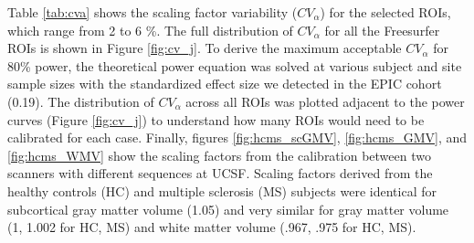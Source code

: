 Table \ref{tab:cva} shows the scaling factor variability ($CV_{\alpha}$) for the selected ROIs, which range from 2 to 6 \%. The full distribution of $CV_{\alpha}$ for all the Freesurfer ROIs is shown in Figure \ref{fig:cv_j}. To derive the maximum acceptable $CV_{\alpha}$ for 80\% power, the theoretical power equation was solved at various subject and site sample sizes with the standardized effect size we detected in the EPIC cohort (0.19). The distribution of $CV_{\alpha}$ across all ROIs was plotted adjacent to the power curves (Figure \ref{fig:cv_j}) to understand how many ROIs would need to be calibrated for each case. Finally, figures \ref{fig:hcms_scGMV}, \ref{fig:hcms_GMV}, and \ref{fig:hcms_WMV} show the scaling factors from the calibration between two scanners with different sequences at UCSF. Scaling factors derived from the healthy controls (HC) and multiple sclerosis (MS) subjects were identical for subcortical gray matter volume (1.05) and very similar for gray matter volume (1, 1.002 for HC, MS) and white matter volume (.967, .975 for HC, MS).